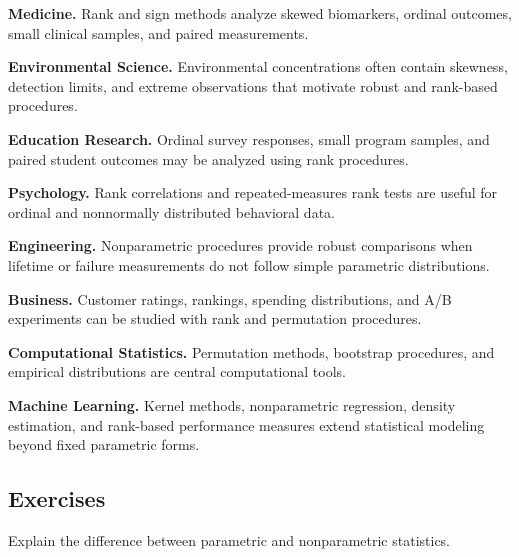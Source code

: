 \begin{applicationbox}

\textbf{Medicine.}
Rank and sign methods analyze skewed biomarkers, ordinal outcomes,
small clinical samples, and paired measurements.

\medskip

\textbf{Environmental Science.}
Environmental concentrations often contain skewness, detection limits,
and extreme observations that motivate robust and rank-based procedures.

\medskip

\textbf{Education Research.}
Ordinal survey responses, small program samples, and paired student
outcomes may be analyzed using rank procedures.

\medskip

\textbf{Psychology.}
Rank correlations and repeated-measures rank tests are useful for ordinal
and nonnormally distributed behavioral data.

\medskip

\textbf{Engineering.}
Nonparametric procedures provide robust comparisons when lifetime or
failure measurements do not follow simple parametric distributions.

\medskip

\textbf{Business.}
Customer ratings, rankings, spending distributions, and A/B experiments
can be studied with rank and permutation procedures.

\medskip

\textbf{Computational Statistics.}
Permutation methods, bootstrap procedures, and empirical distributions
are central computational tools.

\medskip

\textbf{Machine Learning.}
Kernel methods, nonparametric regression, density estimation, and
rank-based performance measures extend statistical modeling beyond fixed
parametric forms.

\end{applicationbox}

\subsection{Exercises}
\label{subsec:nonparametric-exercises}

\begin{exercise}[1]
Explain the difference between parametric and nonparametric statistics.
\end{exercise}

